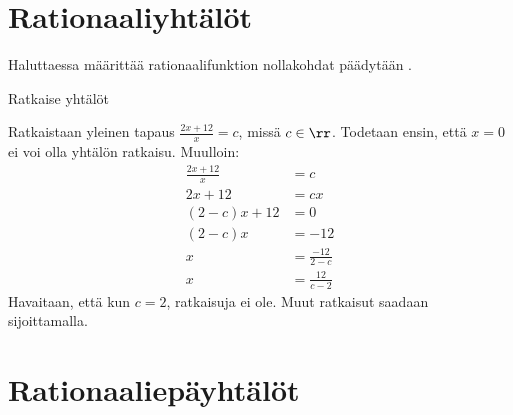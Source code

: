 
\section{Rationaaliyhtälöt}

Haluttaessa määrittää rationaalifunktion nollakohdat päädytään .

\begin{esimerkki}
	Ratkaise yhtälöt
	\begin{esimratk}
		Ratkaistaan yleinen tapaus $\frac{2x+12}{x} = c$, missä $c \in \rr$.
		Todetaan ensin, että $x = 0$ ei voi olla yhtälön ratkaisu. Muulloin:
		\begin{align*}
			\frac{2x+12}{x} &= c \\
			2x+12 &= cx \\
			(2-c)x+12 &= 0 \\
			(2-c)x &= -12 \\
			x &= \frac{-12}{2-c} \\
			x &= \frac{12}{c-2}
		\end{align*}
		Havaitaan, että kun $c = 2$, ratkaisuja ei ole. Muut ratkaisut saadaan sijoittamalla.
	\end{esimratk}
	\begin{esimvast}
	\end{esimvast}
\end{esimerkki}

\section{Rationaaliepäyhtälöt}


